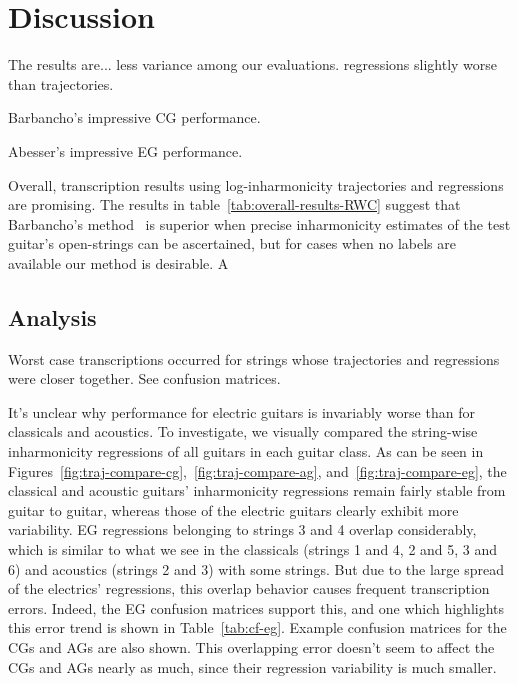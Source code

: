 \documentclass[12pt]{cmuthesis}
\begin{document}
\noindent
\chapter{Discussion}
The results are... 
less variance among our evaluations.
regressions slightly worse than trajectories.

Barbancho's impressive CG performance.

Abesser's impressive EG performance.

Overall, transcription results using log-inharmonicity trajectories and regressions are promising. The results in table~\ref{tab:overall-results-RWC} suggest that Barbancho's method~\cite{barbanchoi2012} is superior when precise inharmonicity estimates of the test guitar's open-strings can be ascertained, but for cases when no labels are available our method is desirable. A 



\section{Analysis}


Worst case transcriptions occurred for strings whose trajectories and regressions were closer together. See confusion matrices.

It's unclear why performance for electric guitars is invariably worse than for classicals and acoustics. To investigate, we visually compared the string-wise inharmonicity regressions of all guitars in each guitar class. As can be seen in Figures~\ref{fig:traj-compare-cg},~\ref{fig:traj-compare-ag}, and~\ref{fig:traj-compare-eg}, the classical and acoustic guitars' inharmonicity regressions remain fairly stable from guitar to guitar, whereas those of the electric guitars clearly exhibit more variability. EG regressions belonging to strings 3 and 4 overlap considerably, which is similar to what we see in the classicals (strings 1 and 4, 2 and 5, 3 and 6) and acoustics (strings 2 and 3) with some strings. But due to the large spread of the electrics' regressions, this overlap behavior causes frequent transcription errors. Indeed, the EG confusion matrices support this, and one which highlights this error trend is shown in Table~\ref{tab:cf-eg}. Example confusion matrices for the CGs and AGs are also shown. This overlapping error doesn't seem to affect the CGs and AGs nearly as much, since their regression variability is much smaller.
\end{document}
